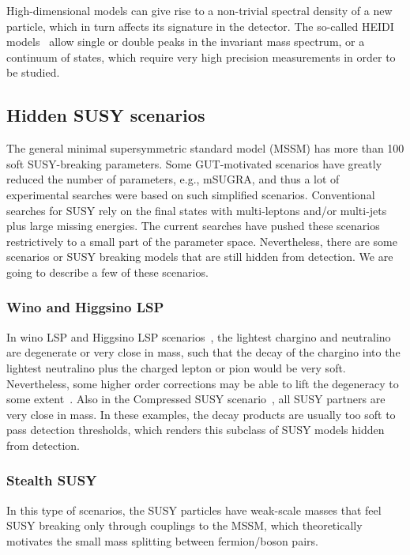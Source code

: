 \documentclass[10pt]{article}
\begin{document}
High-dimensional models can give rise to a non-trivial spectral density of a new particle, which in turn affects its signature in the detector.
The so-called HEIDI models~\cite{vanderBij:2011wy} allow single or double peaks in the invariant mass spectrum, or a continuum of states, which require very high precision measurements in order to be studied.


\subsection{Hidden SUSY scenarios}
%
The general minimal supersymmetric standard model (MSSM) has more than 100 soft SUSY-breaking parameters. Some GUT-motivated scenarios have greatly reduced the number of parameters, e.g., mSUGRA, and thus a lot of experimental searches were based on such simplified scenarios.  Conventional searches for SUSY rely on the final states with multi-leptons and/or multi-jets plus large missing energies. 
The current searches have pushed these scenarios restrictively to a small part of the parameter space. Nevertheless, there are some scenarios or SUSY breaking models that are still hidden from detection. We are going to describe a few of these scenarios.

\subsubsection{Wino and Higgsino LSP}  
%
In wino LSP and Higgsino LSP scenarios~\cite{Blekman:2020hwr,Feng:1999fu,Ibe:2006de}, the lightest chargino and neutralino are degenerate or very close in mass, such that the decay of the chargino into the lightest neutralino plus the charged lepton or pion would be very soft.
Nevertheless, some higher order corrections may be able to lift the degeneracy to some extent~\cite{Dine:2007xi,Cheung:2009qk}.
Also in the Compressed SUSY scenario~\cite{Bhattacherjee:2013wna}, all SUSY partners are very close in mass.
In these examples, the decay products are usually too soft to pass detection thresholds, which renders this subclass of SUSY models hidden from detection.


\subsubsection{Stealth SUSY}
%
In this type of scenarios, the SUSY particles have weak-scale masses that feel SUSY breaking only through couplings to the MSSM, which theoretically motivates the small mass splitting between fermion/boson pairs.
\end{document}
